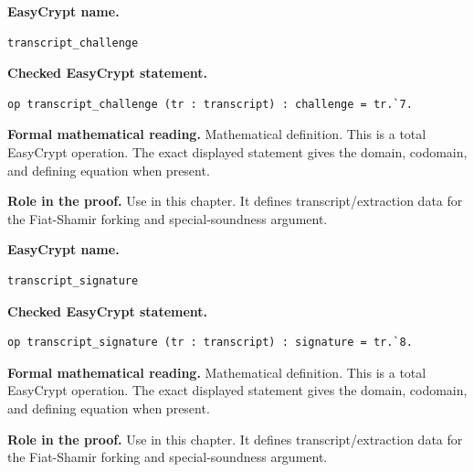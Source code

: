 \begin{formaldefinition}
\noindent\textbf{EasyCrypt name.}
\begin{lstlisting}[language=EasyCrypt,basicstyle=\ttfamily\scriptsize]
transcript_challenge
\end{lstlisting}
\noindent\textbf{Checked EasyCrypt statement.}
\begin{lstlisting}[language=EasyCrypt,basicstyle=\ttfamily\scriptsize]
op transcript_challenge (tr : transcript) : challenge = tr.`7.
\end{lstlisting}
\noindent\textbf{Formal mathematical reading.}
Mathematical definition. This is a total EasyCrypt operation.  The exact displayed statement gives the domain, codomain, and defining equation when present.

\noindent\textbf{Role in the proof.}
Use in this chapter. It defines transcript/extraction data for the Fiat-Shamir forking and special-soundness argument.

\end{formaldefinition}

\begin{formaldefinition}
\noindent\textbf{EasyCrypt name.}
\begin{lstlisting}[language=EasyCrypt,basicstyle=\ttfamily\scriptsize]
transcript_signature
\end{lstlisting}
\noindent\textbf{Checked EasyCrypt statement.}
\begin{lstlisting}[language=EasyCrypt,basicstyle=\ttfamily\scriptsize]
op transcript_signature (tr : transcript) : signature = tr.`8.
\end{lstlisting}
\noindent\textbf{Formal mathematical reading.}
Mathematical definition. This is a total EasyCrypt operation.  The exact displayed statement gives the domain, codomain, and defining equation when present.

\noindent\textbf{Role in the proof.}
Use in this chapter. It defines transcript/extraction data for the Fiat-Shamir forking and special-soundness argument.

\end{formaldefinition}

